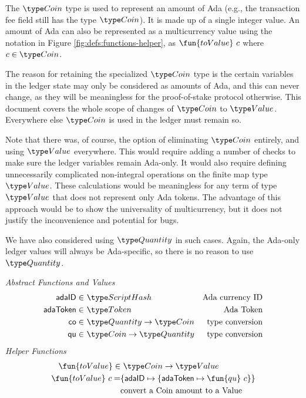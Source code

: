 The $\Coin$ type is used to represent an amount of Ada (e.g., the transaction
fee field still has the type $\Coin$). It is made up of a single
integer value. An amount of Ada can also be represented as a multicurrency value
using the notation in Figure \ref{fig:defs:functions-helper}, as
$\fun{toValue}~c$ where $c \in \Coin$.

The reason for retaining the specialized $\Coin$ type is the certain variables
in the ledger state may only be considered as amounts of Ada, and this can
never change, as they will be meaningless for the proof-of-stake protocol
otherwise. This document
covers the whole scope of changes of $\Coin$ to $\Value$. Everywhere else $\Coin$
is used in the ledger must remain so.

Note that there was, of course, the option of eliminating $\Coin$ entirely,
and using $\Value$ everywhere. This would require adding a number of checks
to make sure the ledger variables remain Ada-only. It would also require
defining unnecessarily complicated non-integral operations on the finite map
type $\Value$. These calculations would be meaningless for any term of type
$\Value$ that does not represent only Ada tokens. The advantage of this approach
would be to show the universality of multicurrency, but it does not
justify the inconvenience and potential for bugs.

We have also considered using $\Quantity$ in such cases. Again, the Ada-only
ledger values will always be Ada-specific, so there is no reason to use $\Quantity$.


\begin{figure*}[htb]
  \emph{Abstract Functions and Values}
  \begin{align*}
    \mathsf{adaID} \in& ~\ScriptHash
    & \text{Ada currency ID} \\
    \mathsf{adaToken} \in& ~\Token
    & \text{Ada Token} \\
    \mathsf{co} \in& ~\Quantity \to \Coin
    & \text{type conversion} \\
    \mathsf{qu} \in& ~\Coin \to \Quantity
    & \text{type conversion} \\
  \end{align*}
  \emph{Helper Functions}
  \begin{align*}
    \fun{toValue} \in & ~\Coin\to \Value \\
    \fun{toValue}~ c = & \{\mathsf{adaID} \mapsto \{\mathsf{adaToken} \mapsto \fun{qu}~c\}\} \\
    &\text{convert a Coin amount to a Value} \\
  \end{align*}
  \caption{Multicurrency}
  \label{fig:defs:functions-helper}
\end{figure*}

